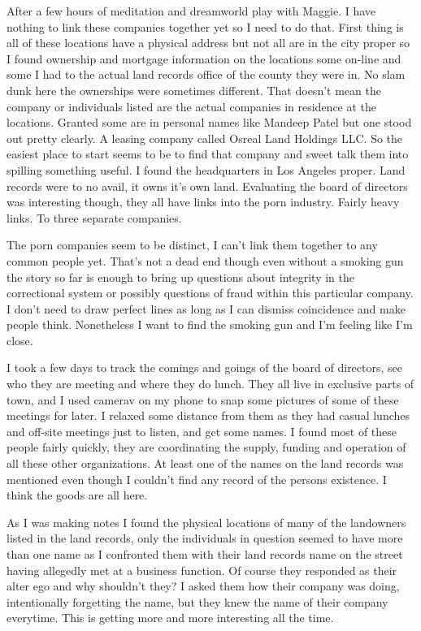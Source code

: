 After a few hours of meditation and dreamworld play with Maggie. I have nothing to link these companies together yet so I need to do that. First thing is all of these locations have a physical address but not all are in the city proper so I found ownership and mortgage information on the locations some on-line and some I had to the actual land records office of the county they were in. No slam dunk here the ownerships were sometimes different. That doesn't mean the company or individuals listed are the actual companies in residence at the locations. Granted some are in personal names like Mandeep Patel but one stood out pretty clearly. A leasing company called Osreal Land Holdings LLC. So the easiest place to start seems to be to find that company and sweet talk them into spilling something useful. I found the headquarters in Los Angeles proper. Land records were to no avail, it owns it's own land. Evaluating the board of directors was interesting though, they all have links into the porn industry. Fairly heavy links. To three separate companies.

The porn companies seem to be distinct, I can't link them together to any common people yet. That's not a dead end though even without a smoking gun the story so far is enough to bring up questions about integrity in the correctional system or possibly questions of fraud within this particular company. I don't need to draw perfect lines as long as I can dismiss coincidence and make people think. Nonetheless I want to find the smoking gun and I'm feeling like I'm close.

I took a few days to track the comings and goings of the board of directors, see who they are meeting and where they do lunch. They all live in exclusive parts of town, and I used camerav on my phone to snap some pictures of some of these meetings for later. I relaxed some distance from them as they had casual lunches and off-site meetings just to listen, and get some names. I found most of these people fairly quickly, they are coordinating the supply, funding and operation of all these other organizations. At least one of the names on the land records was mentioned even though I couldn't find any record of the persons existence. I think the goods are all here.

As I was making notes I found the physical locations of many of the landowners listed in the land records, only the individuals in question seemed to have more than one name as I confronted them with their land records name on the street having allegedly met at a business function. Of course they responded as their alter ego and why shouldn't they? I asked them how their company was doing, intentionally forgetting the name, but they knew the name of their company everytime. This is getting more and more interesting all the time.

